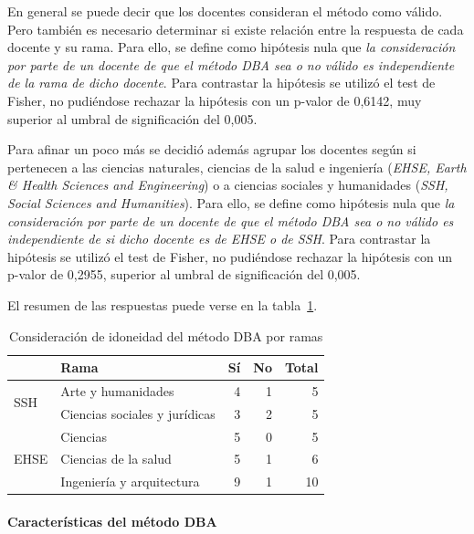 En general se puede decir que los docentes consideran el método como válido. Pero también es necesario determinar si existe relación entre la respuesta de cada docente y su rama. Para ello, se define como hipótesis nula que \emph{la consideración por parte de un docente de que el método DBA sea o no válido es independiente de la rama de dicho docente}. Para contrastar la hipótesis se utilizó el test de Fisher, no pudiéndose rechazar la hipótesis con un p-valor de 0,6142, muy superior al umbral de significación del 0,005.

Para afinar un poco más se decidió además agrupar los docentes según si pertenecen a las ciencias naturales, ciencias de la salud e ingeniería (\emph{EHSE, Earth \& Health Sciences and Engineering}) o a ciencias sociales y humanidades (\emph{SSH, Social Sciences and Humanities}). Para ello, se define como hipótesis nula que \emph{la consideración por parte de un docente de que el método DBA sea o no válido es independiente de si  dicho docente es de EHSE o de SSH}. Para contrastar la hipótesis se utilizó el test de Fisher, no pudiéndose rechazar la hipótesis con un p-valor de 0,2955, superior al umbral de significación del 0,005.

El resumen de las respuestas puede verse en la tabla~\ref{tab:cap:encuesta:metodoDBA:rama}.

\begin{table}
  \begin{center}
  \begin{tabular}{| l | l | r | r | r |}
    \hline
    & Rama & Sí & No & Total \\
    \hline
    \hline
    \multirow{2}{2.5cm}{SSH} & Arte y humanidades & 4 & 1 & 5  \\
    \cline{2-5}
    & Ciencias sociales y jurídicas & 3 & 2 & 5  \\
    \hline
    \multirow{3}{2.5cm}{EHSE} & Ciencias & 5 & 0 & 5  \\
    \cline{2-5}
    & Ciencias de la salud & 5 & 1 & 6  \\
    \cline{2-5}
    & Ingeniería y arquitectura & 9 & 1 & 10 \\
    \hline
  \end{tabular}
\end{center}
\caption{Consideración de idoneidad del método DBA por ramas}
\label{tab:cap:encuesta:metodoDBA:rama}
\end{table}

\paragraph*{Características del método DBA}


